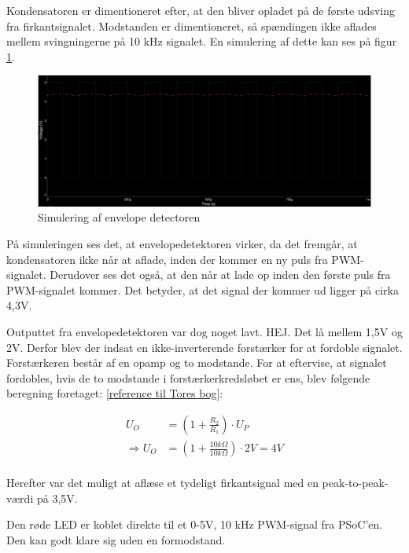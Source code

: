 Kondensatoren er dimentioneret efter, at den bliver opladet på de første udsving fra firkantsignalet. Modstanden er dimentioneret, så spændingen ikke aflades mellem svingningerne på 10 kHz signalet. En simulering af dette kan ses på figur \ref{fig:envdetsim}. 

\begin{figure}[H]
	\centering
	\includegraphics[width=\textwidth]{Afsnit/DesignOgImplementering/images/envelope_detector}
	\caption{Simulering af envelope detectoren}
	\label{fig:envdetsim}
\end{figure}

På simuleringen ses det, at envelopedetektoren virker, da det fremgår, at kondensatoren ikke når at aflade, inden der kommer en ny puls fra PWM-signalet. Derudover ses det også, at den når at lade op inden den første puls fra PWM-signalet kommer. Det betyder, at det signal der kommer ud ligger på cirka 4,3V. 

Outputtet fra envelopedetektoren var dog noget lavt. HEJ. Det lå mellem 1,5V og 2V. Derfor blev der indsat en ikke-inverterende forstærker for at fordoble signalet. Forstærkeren består af en opamp og to modstande. For at eftervise, at signalet fordobles, hvis de to modstande i forstærkerkredsløbet er ens, blev følgende beregning foretaget: \ref{reference til Tores bog}: 

\begin{align}
U_{O}&=(1+\frac{R_{2}}{R_{1}}) \cdot U_{P} \\ 	\nonumber
\Rightarrow U_{O}&=(1+\frac{10k\Omega}{10k\Omega}) \cdot 2V = 4V \\	\nonumber 
\end{align}

Herefter var det muligt at aflæse et tydeligt firkantsignal med en peak-to-peak-værdi på 3,5V. 

Den røde LED er koblet direkte til et 0-5V, 10 kHz PWM-signal fra PSoC'en. Den kan godt klare sig uden en formodstand. 

